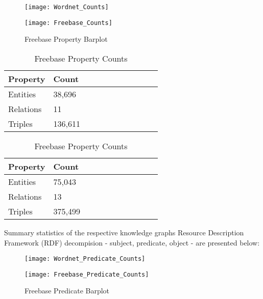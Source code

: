 \begin{figure}[H]
	\parbox{.5\linewidth}{
   		\caption{Wordnet Property Barplot}
   		\centering
    		\texttt{[image: Wordnet\_Counts]}
		}
	\hfill
	\parbox{.5\linewidth}{
		\caption{Freebase Property Barplot}
   		\centering
    		\texttt{[image: Freebase\_Counts]}
		}
\end{figure}


\begin{table}[H]
	\parbox{.5\linewidth}{
		\caption{Wordnet Property Counts}
		\centering
		\begin{tabular}{lllllllllll}
  			\textbf{Property} & \textbf{Count}  \\
  			\hline
  			Entities & 38,696  \\
  			Relations & 11  \\
  			Triples & 136,611  \\
		\end{tabular}
		}
	\hfill
	\parbox{.5\linewidth}{
		\caption{Freebase Property Counts}
		\centering
		\begin{tabular}{lllllllllll}
  			\textbf{Property} & \textbf{Count}  \\
  			\hline
  			Entities & 75,043   \\
  			Relations & 13  \\
  			Triples & 375,499  \\
		\end{tabular}
		}
\end{table}


Summary statistics of the respective knowledge graphs Resource Description Framework (RDF) decompision - subject, predicate, object - are presented below:


\begin{figure}[H]
	\parbox{.5\linewidth}{
   		\caption{Wordnet Predicate Barplot}
   		\centering
    		\texttt{[image: Wordnet\_Predicate\_Counts]}
		}
	\hfill
	\parbox{.5\linewidth}{
		\caption{Freebase Predicate Barplot}
   		\centering
		\texttt{[image: Freebase\_Predicate\_Counts]}
		}
\end{figure}

